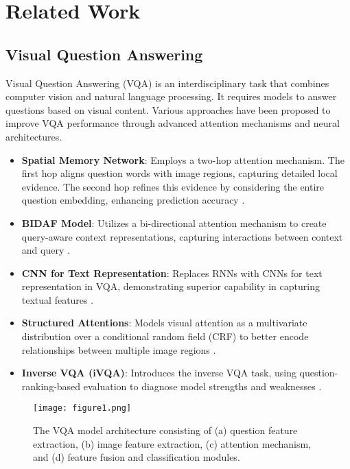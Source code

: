 \section{Related Work}
\subsection{Visual Question Answering}
Visual Question Answering (VQA) is an interdisciplinary task that combines computer vision and natural language processing. It requires models to answer questions based on visual content. Various approaches have been proposed to improve VQA performance through advanced attention mechanisms and neural architectures.

\begin{itemize}
    \item \textbf{Spatial Memory Network}: Employs a two-hop attention mechanism. The first hop aligns question words with image regions, capturing detailed local evidence. The second hop refines this evidence by considering the entire question embedding, enhancing prediction accuracy \cite{chen2018}.
    \item \textbf{BIDAF Model}: Utilizes a bi-directional attention mechanism to create query-aware context representations, capturing interactions between context and query \cite{seo2017}.
    \item \textbf{CNN for Text Representation}: Replaces RNNs with CNNs for text representation in VQA, demonstrating superior capability in capturing textual features \cite{noh2016}.
    \item \textbf{Structured Attentions}: Models visual attention as a multivariate distribution over a conditional random field (CRF) to better encode relationships between multiple image regions \cite{zhang2018}.
    \item \textbf{Inverse VQA (iVQA)}: Introduces the inverse VQA task, using question-ranking-based evaluation to diagnose model strengths and weaknesses \cite{gordon2018}.
\end{itemize}
\begin{figure*}[!t]
    \centering
    \texttt{[image: figure1.png]} %
    \caption{The VQA model architecture consisting of (a) question feature extraction, (b) image feature extraction, (c) attention mechanism, and (d) feature fusion and classification modules.}
    \label{fig:framework}
\end{figure*}

